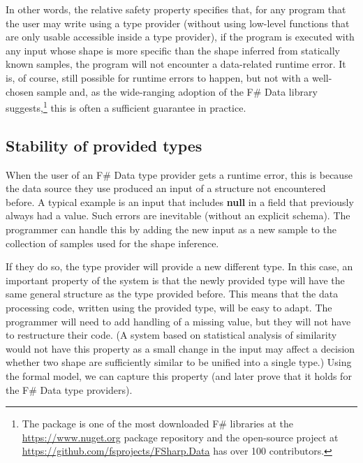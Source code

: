 \documentclass[fleqn,11pt]{report}
\newcommand{\kvd}[1]{\textnormal{\ttfamily\bfseries #1}}
\theoremstyle{definition}
\begin{document}
In other words, the relative safety property specifies that, for any program that the user may
write using a type provider (without using low-level functions that are only usable accessible
inside a type provider), if the program is executed with any input whose shape is more specific
than the shape inferred from statically known samples, the program will not encounter a data-related
runtime error. It is, of course, still possible for runtime errors to happen, but not with a
well-chosen sample and, as the wide-ranging adoption of the F\# Data library suggests,\footnote{The
package is one of the most downloaded F\# libraries at the \url{https://www.nuget.org} package
repository and the open-source project at \url{https://github.com/fsprojects/FSharp.Data} has
over 100 contributors.} this is often a sufficient guarantee in practice.

\subsection{Stability of provided types}
When the user of an F\# Data type provider gets a runtime error, this is because the
data source they use produced an input of a structure not encountered before. A typical example
is an input that includes \kvd{null} in a field that previously always had a value.
Such errors are inevitable (without an explicit schema). The programmer can handle this by
adding the new input as a new sample to the collection of samples used for the shape inference.

If they do so, the type provider will provide a new different type. In this case, an important
property of the system is that the newly provided type will have the same general structure as
the type provided before. This means that the data processing code, written using the provided
type, will be easy to adapt. The programmer will need to add handling of a missing value, but
they will not have to restructure their code. (A system based on statistical analysis of similarity
would not have this property as a small change in the input may affect a decision whether two
shape are sufficiently similar to be unified into a single type.) Using the formal model, we
can capture this property (and later prove that it holds for the F\# Data type providers).
\end{document}
